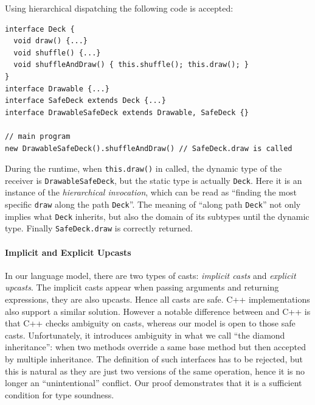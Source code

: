 Using hierarchical dispatching the following code is accepted:
\vspace{3pt}\begin{lstlisting}
interface Deck {
  void draw() {...}
  void shuffle() {...}
  void shuffleAndDraw() { this.shuffle(); this.draw(); }
}
interface Drawable {...}
interface SafeDeck extends Deck {...}
interface DrawableSafeDeck extends Drawable, SafeDeck {}

// main program
new DrawableSafeDeck().shuffleAndDraw() // SafeDeck.draw is called
\end{lstlisting}\vspace{3pt}
During the runtime, when \lstinline|this.draw()| in called,
the dynamic type of the receiver is \lstinline|DrawableSafeDeck|, but the static type is actually
\lstinline|Deck|. Here it is an instance of the \textit{hierarchical invocation}, which can be read as 
``finding the most specific \lstinline|draw| along the path \lstinline|Deck|''. The meaning of ``along path
\lstinline|Deck|'' not only implies what \lstinline|Deck| inherits, but also the domain of its subtypes until the
dynamic type. Finally \lstinline|SafeDeck.draw| is correctly returned.


\paragraph{Implicit and Explicit Upcasts}
In our language model, there are two types of casts: \emph{implicit casts} and \emph{explicit upcasts}. The implicit casts appear
when passing arguments and returning expressions, they are also
upcasts. Hence all casts are safe. C++ implementations also support a
similar solution. However a notable difference between \MIM{} and C++
is that C++ checks ambiguity on casts, whereas our model is open to those safe casts. Unfortunately,
it introduces ambiguity in what we call ``the diamond inheritance'': when two methods override a same base method
but then accepted by multiple inheritance. The definition of such interfaces has to be rejected,
but this is natural as they are just two versions of the same operation, hence it is no longer an ``unintentional'' conflict.
Our proof demonstrates that it is a sufficient condition for type
soundness.




